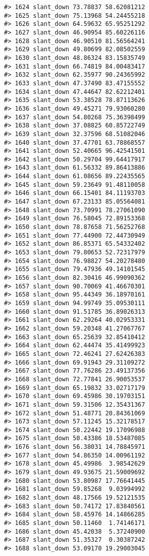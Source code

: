 \documentclass[
]{book}
\theoremstyle{definition}
\theoremstyle{definition}
\theoremstyle{definition}
\theoremstyle{definition}
\theoremstyle{remark}
\begin{document}
\begin{verbatim}
#> 1624 slant_down 73.78837 58.62081212
#> 1625 slant_down 75.13968 54.24455218
#> 1626 slant_down 64.59632 65.95251292
#> 1627 slant_down 46.90954 85.60226116
#> 1628 slant_down 46.90510 81.56564241
#> 1629 slant_down 49.80699 82.08502559
#> 1630 slant_down 48.86324 83.15835749
#> 1631 slant_down 66.74819 84.00483417
#> 1632 slant_down 62.35977 90.24365992
#> 1633 slant_down 47.37490 83.47155552
#> 1634 slant_down 47.44647 82.62212401
#> 1635 slant_down 53.38528 78.87113626
#> 1636 slant_down 49.45271 79.93060280
#> 1637 slant_down 54.80268 75.36398499
#> 1638 slant_down 37.08825 60.85722749
#> 1639 slant_down 32.37596 68.51082046
#> 1640 slant_down 37.47701 63.78868557
#> 1641 slant_down 52.40665 96.42541501
#> 1642 slant_down 50.29704 99.64417917
#> 1643 slant_down 61.56332 89.86413886
#> 1644 slant_down 61.08656 89.22435565
#> 1645 slant_down 59.23649 91.48110058
#> 1646 slant_down 66.15401 84.11193703
#> 1647 slant_down 67.23133 85.05564081
#> 1648 slant_down 73.70991 78.27061090
#> 1649 slant_down 76.58045 72.89153368
#> 1650 slant_down 78.87658 71.56252768
#> 1651 slant_down 77.44900 72.44730949
#> 1652 slant_down 86.85371 65.54332402
#> 1653 slant_down 79.80653 52.72317979
#> 1654 slant_down 76.98827 54.20278480
#> 1655 slant_down 79.47936 49.14101545
#> 1656 slant_down 82.30416 46.99090362
#> 1657 slant_down 90.70069 41.46670301
#> 1658 slant_down 95.44349 36.18970161
#> 1659 slant_down 94.99749 35.09530111
#> 1660 slant_down 91.51785 36.89026313
#> 1661 slant_down 62.29264 40.02953331
#> 1662 slant_down 59.20348 41.27067767
#> 1663 slant_down 65.25639 32.85410412
#> 1664 slant_down 62.44474 35.41499923
#> 1665 slant_down 72.46241 27.62426383
#> 1666 slant_down 69.91943 29.31109272
#> 1667 slant_down 77.76286 23.49137356
#> 1668 slant_down 72.77841 26.90053537
#> 1669 slant_down 65.19832 33.02717179
#> 1670 slant_down 69.45986 30.19703151
#> 1671 slant_down 59.31506 12.35431367
#> 1672 slant_down 51.48771 20.84361069
#> 1673 slant_down 57.11245 15.32178517
#> 1674 slant_down 50.22442 19.17096988
#> 1675 slant_down 50.43386 18.53487085
#> 1676 slant_down 56.38031 14.78845971
#> 1677 slant_down 54.86350 14.00961192
#> 1678 slant_down 45.49986  3.98542629
#> 1679 slant_down 49.93675 21.59009692
#> 1680 slant_down 53.80987 17.76641445
#> 1681 slant_down 59.85268  9.03994992
#> 1682 slant_down 48.17566 19.52121535
#> 1683 slant_down 50.74172 17.83840561
#> 1684 slant_down 58.45976 14.14866285
#> 1685 slant_down 50.11460  1.74146171
#> 1686 slant_down 45.42038  5.37240900
#> 1687 slant_down 51.35327  0.30387242
#> 1688 slant_down 53.09170 19.29003045

\end{verbatim}
\end{document}
